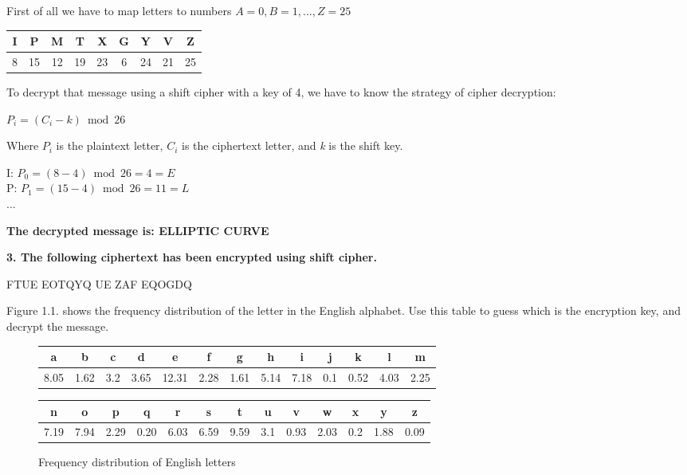 \documentclass[]{article}
\numberwithin{figure}{section}
\begin{document}
\noindent 
First of all we have to map letters to numbers $A = 0, B = 1,..., Z=25$ 
\medskip
\begin{center}
	\begin{tabular}{|c|c|c|c|c|c|c|c|c|}
		\hline
		I & P & M & T & X & G & Y & V & Z \\
		\hline
		8 & 15 & 12 & 19 & 23 & 6 & 24 & 21 & 25 \\
		\hline
	\end{tabular}
\end{center}
To decrypt that message using a shift cipher with a key of 4, we have to know the strategy of cipher decryption:
\begin{center}
	$P_i = (C_i - k) \bmod 26$
\end{center}
Where $P_i$ is the plaintext letter, $C_i$ is the ciphertext letter, and \textit{k} is the shift key.
\medskip
\begin{center}
I: $P_0 = (8 - 4) \bmod 26 = 4 = E$ \\
P: $P_1 = (15 - 4) \bmod 26 = 11 = L$ \\
...

\textbf{The decrypted message is: ELLIPTIC CURVE}
\end{center}
\newpage
\noindent
\textbf{3. The following ciphertext has been encrypted using shift cipher.}
\begin{center}
	FTUE EOTQYQ UE ZAF EQOGDQ
\end{center}
\indent
Figure 1.1. shows the frequency distribution of the letter in the English alphabet. Use this table to guess which is the encryption key, and decrypt the message.
\begin{figure}[h]
	\centering
	\begin{tabular}{|c|c|c|c|c|c|c|c|c|c|c|c|c|}
		\hline
		a & b & c & d & e & f & g & h & i & j & k & l & m \\
		\hline
		8.05 & 1.62 & 3.2 & 3.65 & 12.31 & 2.28 & 1.61 & 5.14 & 7.18 & 0.1 & 0.52 & 4.03 & 2.25 \\
		\hline
	\end{tabular}
	\begin{tabular}{|c|c|c|c|c|c|c|c|c|c|c|c|c|}
		\hline
		n & o & p & q & r & s & t & u & v & w & x & y & z \\
		\hline
		7.19 & 7.94 & 2.29 & 0.20 & 6.03 & 6.59 & 9.59 & 3.1 & 0.93 & 2.03 & 0.2 & 1.88 & 0.09 \\
		\hline
	\end{tabular}
	\caption{Frequency distribution of English letters}
\end{figure}
\end{document}
